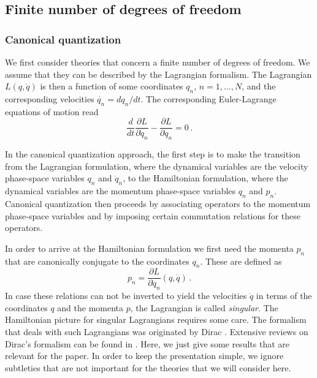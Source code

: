 \documentclass[12pt]{article}
\begin{document}
\subsection{Finite number of degrees of freedom}
\subsubsection{Canonical quantization}\label{canonicalquantization}
We first consider theories that concern a finite number of degrees of freedom. We assume that they can be described by the Lagrangian formalism. The Lagrangian $L(q,\dot{q})$ is then a function of some coordinates $q_n$, $n=1,\dots,N$, and the corresponding velocities $\dot{q_n} = d q_n/ d t$. The corresponding Euler-Lagrange equations of motion read
\begin{equation}
\frac{d }{dt} \frac{\partial  L}{\partial  {\dot q}_n } - \frac{\partial  L}{\partial  q_n} = 0\,.
\label{f.1}
\end{equation}

In the canonical quantization approach, the first step is to make the transition from the Lagrangian formulation, where the dynamical variables are the velocity phase-space variables $q_n$ and $\dot{q}_n$, to the Hamiltonian formulation, where the dynamical variables are the momentum phase-space variables $q_n$ and $p_n$. Canonical quantization then proceeds by associating operators to the momentum phase-space variables and by imposing certain commutation relations for these operators. 

In order to arrive at the Hamiltonian formulation we first need the momenta $p_n$ that are canonically conjugate to the coordinates $q_n$. These are defined as
\begin{equation}
p_n = \frac{\partial  L}{\partial {\dot q}_n }(q,\dot{q})\,.
\label{f.2}
\end{equation}
In case these relations can not be inverted to yield the velocities $\dot{q}$ in terms of the coordinates $q$ and the momenta $p$, the Lagrangian is called {\em singular}. The Hamiltonian picture for singular Lagrangians requires some care. The formalism that deals with such Lagrangians was originated by Dirac \cite{dirac64}. Extensive reviews on Dirac's formalism can be found in \cite{dirac64,hanson76,sundermeyer82,gitman90,henneaux91}. Here, we just give some results that are relevant for the paper. In order to keep the presentation simple, we ignore subtleties that are not important for the theories that we will consider here.
\end{document}
